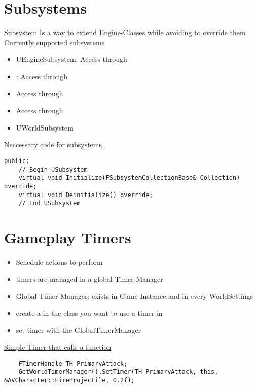     \section{Subsystems}
        \glsdesc{Subsystem}
        Is a way to extend Engine-Classes while avoiding to override them \\
        \uline{Currently supported subsystems}
        \begin{itemize}
            \item UEngineSubsystem: Access through 
            \item {} : Access through 
            \item {} Access through 
            \item {} Access through 
            \item UWorldSubsystem
        \end{itemize}
        \uline{Neccessary code for subsystems}
        \begin{lstlisting}
public:
    // Begin USubsystem
    virtual void Initialize(FSubsystemCollectionBase& Collection) override;
    virtual void Deinitialize() override;
    // End USubsystem
        \end{lstlisting}

    \section{Gameplay Timers}
        \begin{itemize}
            \item Schedule actions to perform
            \item timers are managed in a global Timer Manager
            \item Global Timer Manager: exists in Game Instance and in every WorldSettings
        \end{itemize}
        \begin{itemize}
            \item create a  in the class you want to use a timer in
            \item set timer with the GlobalTimerManager
        \end{itemize}
        \uline{Simple Timer that calls a function}
        \begin{lstlisting}
    FTimerHandle TH_PrimaryAttack;
    GetWorldTimerManager().SetTimer(TH_PrimaryAttack, this, &AVCharacter::FireProjectile, 0.2f);
        \end{lstlisting}

